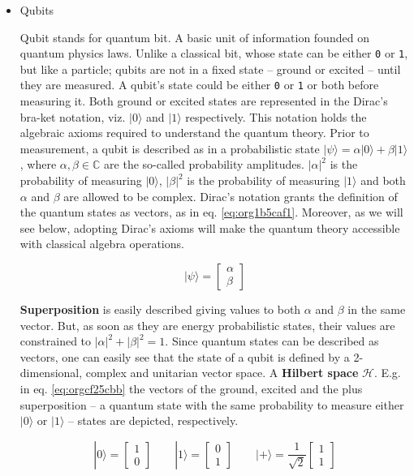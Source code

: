 \begin{itemize}
\item Qubits
\label{sec:orgd367194}

Qubit stands for quantum bit.
A basic unit of information founded on quantum physics laws.
Unlike a classical bit, whose state can be either \texttt{0} or \texttt{1}, but like a particle; qubits are not in a fixed state -- ground or excited -- until they are measured.
A qubit's state could be either \texttt{0} or \texttt{1} or both before measuring it.
Both ground or excited states are represented in the Dirac's bra-ket notation, viz. \(| 0 \rangle\) and \(| 1 \rangle\) respectively.
This notation holds the algebraic axioms \cite{Nielsen_2009} required to understand the quantum theory.
Prior to measurement, a qubit is described as in a probabilistic state \(| \psi \rangle = \alpha | 0 \rangle + \beta | 1 \rangle\), where \(\alpha, \beta \in \mathbb{C}\) are the so-called probability amplitudes.
\(|\alpha|^2\) is the probability of measuring \(| 0 \rangle\), \(|\beta|^2\) is the probability of measuring \(| 1 \rangle\) and both \(\alpha\) and \(\beta\) are allowed to be complex.
Dirac's notation grants the definition of the quantum states as vectors, as in eq. \ref{eq:org1b5caf1}.
Moreover, as we will see below, adopting Dirac's axioms will make the quantum theory accessible with classical algebra operations. 

\begin{equation}
\label{eq:org1b5caf1}
|\psi\rangle = \begin{bmatrix}\alpha \\ \beta \end{bmatrix}
\end{equation}

\textbf{Superposition} is easily described giving values to both \(\alpha\) and \(\beta\) in the same vector.
But, as soon as they are energy probabilistic states, their values are constrained to \(|\alpha|^2 + |\beta|^2 = 1\).
Since quantum states can be described as vectors, one can easily see that the state of a qubit is defined by a 2-dimensional, complex and unitarian vector space.
A \textbf{Hilbert space} \(\mathscr{H}\).
E.g. in eq. \ref{eq:orgcf25cbb} the vectors of the ground, excited and the plus superposition -- a quantum state with the same probability to measure either \(|0\rangle\) or \(|1\rangle\) -- states are depicted, respectively.

\begin{equation}
\label{eq:orgcf25cbb}
|0\rangle = \begin{bmatrix}1 \\ 0 \end{bmatrix} \quad \quad |1\rangle = \begin{bmatrix}0 \\ 1 \end{bmatrix} \quad \quad |+\rangle = \frac{1}{\sqrt{2}} \begin{bmatrix}1 \\ 1 \end{bmatrix}
\end{equation}


\end{itemize}
